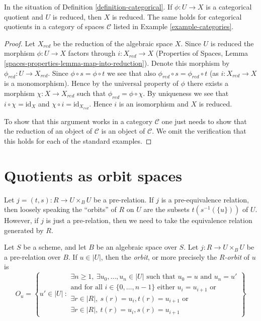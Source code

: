 \begin{lemma}
\label{lemma-categorical-reduced}
In the situation of
Definition \ref{definition-categorical}.
If $\phi : U \to X$ is a categorical quotient and $U$ is reduced,
then $X$ is reduced. The same holds for categorical quotients in
a category of spaces $\mathcal{C}$ listed in
Example \ref{example-categories}.
\end{lemma}

\begin{proof}
Let $X_{red}$ be the reduction of the algebraic space $X$.
Since $U$ is reduced the morphism $\phi : U \to X$ factors through
$i : X_{red} \to X$ (Properties of Spaces, Lemma
\ref{spaces-properties-lemma-map-into-reduction}). Denote this morphism
by $\phi_{red} : U \to X_{red}$. Since $\phi \circ s = \phi \circ t$ we
see that also $\phi_{red} \circ s = \phi_{red} \circ t$ (as
$i : X_{red} \to X$ is a monomorphism). Hence by the universal property
of $\phi$ there exists a morphism $\chi : X \to X_{red}$ such that
$\phi_{red} = \phi \circ \chi$. By uniqueness we see that
$i \circ \chi = \text{id}_X$ and $\chi \circ i = \text{id}_{X_{red}}$.
Hence $i$ is an isomorphism and $X$ is reduced.

\medskip\noindent
To show that this argument works in a category $\mathcal{C}$ one
just needs to show that the reduction of an object of $\mathcal{C}$
is an object of $\mathcal{C}$. We omit the verification that this
holds for each of the standard examples.
\end{proof}





\section{Quotients as orbit spaces}
\label{section-orbits}

\noindent
Let $j = (t, s) : R \to U \times_B U$ be a pre-relation.
If $j$ is a pre-equivalence relation, then loosely speaking
the ``orbits'' of $R$ on $U$
are the subsets $t(s^{-1}(\{u\}))$ of $U$. However, if $j$ is just a
pre-relation, then we need to take the equivalence relation generated
by $R$.

\begin{definition}
\label{definition-orbit}
Let $S$ be a scheme, and let $B$ be an algebraic space over $S$.
Let $j : R \to U \times_B U$ be a pre-relation over $B$.
If $u \in |U|$, then the {\it orbit}, or more precisely the
{\it $R$-orbit} of $u$ is
$$
O_u =
\left\{
u' \in |U|\ :
\begin{matrix}
\exists n \geq 1, \ \exists u_0, \ldots, u_n \in |U|\text{ such that }
u_0 = u \text{ and } u_n = u' \\
\text{and for all }i \in \{0, \ldots, n - 1\}\text{ either }
u_i = u_{i + 1}\text{ or } \\
\exists r \in |R|, \ s(r) = u_i, t(r) = u_{i + 1}
\text{ or } \\
\exists r \in |R|, \ t(r) = u_i, s(r) = u_{i + 1}
\end{matrix}
\right\}
$$
\end{definition}

